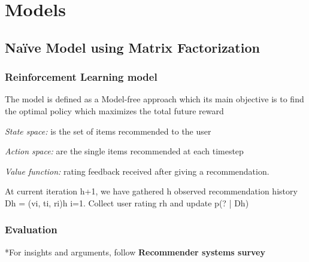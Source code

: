 \chapter{Models}
\label{chapterlabel3}

\section{Na\"{i}ve Model using Matrix Factorization}



\subsection{Reinforcement Learning model}

The model is defined as a Model-free approach which its main objective is to find the optimal policy which maximizes the total future reward

\textit{State space:} is the set of items recommended to the user

\textit{Action space:} are the single items recommended at each timestep

\textit{Value function:} rating feedback received after giving a recommendation.



At current iteration h+1, we have gathered h observed recommendation history Dh = {(vi, ti, ri)}h
i=1.
Collect user rating rh and update p(? | Dh)

\subsection{Evaluation}

*For insights and arguments, follow \textbf{Recommender systems survey}


